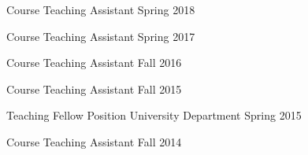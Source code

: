 


\begin{cvhonors}

  \cvhonor
    {Course} %
    {Teaching Assistant} %
    {} %
    {Spring 2018} %

  \cvhonor
    {Course} %
    {Teaching Assistant} %
    {} %
    {Spring 2017} %

  \cvhonor
    {Course} %
    {Teaching Assistant} %
    {} %
    {Fall 2016} %

  \cvhonor
    {Course} %
    {Teaching Assistant} %
    {} %
    {Fall 2015} %

  \cvhonor
    {Teaching Fellow Position} %
    {University Department} %
    {} %
    {Spring 2015} %

  \cvhonor
    {Course} %
    {Teaching Assistant} %
    {} %
    {Fall 2014} %

\end{cvhonors}
